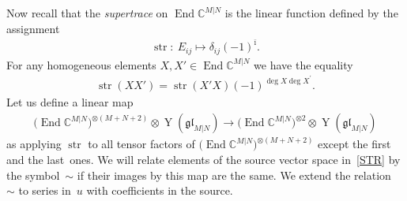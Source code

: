 \documentclass[pdftex]{sigma}
\numberwithin{equation}{section}
\def\bi{{\bar\imath }}
\def\CC{{\mathbb{C}}}
\def\CMN{\CC^{M|N}}
\def\de{\delta}
\def\End{\operatorname{End}}
\def\glMN{\mathfrak{gl}_{M|N}}
\def\ot{\otimes}
\def\str{\operatorname{str}}
\def\YMN{\operatorname{Y}(\glMN)}
\begin{document}
Now recall that the \emph{supertrace} on $\End\CMN$ is the linear function
defined by the assignment
\begin{gather*}
\str\colon \ E_{ij}\mapsto\de_{ij} (-1)^{\bi} .
\end{gather*}
For any homogeneous elements $X,X'\in\End\CMN$ we have the equality
\begin{gather*}
\str (X X' )=
\str (X'X ) (-1)^{\deg X\deg X^\prime}.
\end{gather*}
Let us define a linear map
\begin{gather}\label{STR}
\big(\End\CMN\big)^{\ot (M+N+2)}\ot\YMN\to\big(\End\CMN\big)^{\ot 2}\ot\YMN
\end{gather}
as applying $\str$ to all tensor factors of
$\big(\End\CMN\big)^{\ot (M+N+2)}$ except the first and the last~ones.
We will relate elements of the source vector space in~\eqref{STR}
by the symbol~$\sim$ if
their images by this map are the same.
We extend the relation~$\sim$ to series in~$u$ with coefficients in the source.
\end{document}
